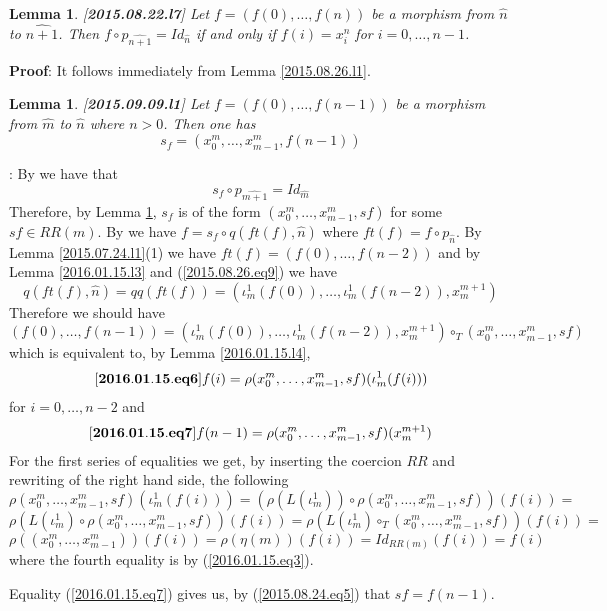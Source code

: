 \documentclass[11pt]{article}
\newenvironment{eq}{\begin{equation}}{\end{equation}}
\newenvironment{proof}{{\bf Proof}:}{\vskip 5mm }
\newtheorem{lemma}[proposition]{Lemma}
\newcommand{\llabel}[1]{\label{#1}[{\bf #1}]}
\newcommand{\wh}{\widehat}
\newcommand{\mbind}{\rho}
\newcommand{\hc}{\circ_{T}}
\begin{document}
%
\begin{lemma}
\llabel{2015.08.22.l7}
Let $f=(f(0),\dots,f(n))$ be a morphism from $\wh{n}$ to $\wh{n+1}$. Then $f\circ p_{\wh{n+1}}=Id_{\wh{n}}$ if and only if $f(i)=x_i^{n}$ for $i=0,\dots,n-1$.
\end{lemma}
%
\begin{proof}
It follows immediately from Lemma \ref{2015.08.26.l1}.
\end{proof}
%
\begin{lemma}
\llabel{2015.09.09.l1}
Let $f=(f(0),\dots,f(n-1))$ be a morphism from $\wh{m}$ to $\wh{n}$ where $n>0$. Then one has
%
$$s_f=(x_0^{m},\dots,x_{m-1}^{m},f(n-1))$$
%
\end{lemma}
%
\begin{proof}
By \cite[Definition 2.3(2)]{Csubsystems} we have that 
%
$$s_f\circ p_{\wh{m+1}}=Id_{\wh{m}}$$
%
Therefore, by Lemma \ref{2015.08.22.l7}, $s_f$ is of the form $(x_0^m,\dots,x_{m-1}^m,sf)$ for some $sf\in RR(m)$. By \cite[Definition 2.3(3)]{Csubsystems} we have $f=s_f\circ q(ft(f),\wh{n})$ where $ft(f)=f\circ p_{\wh{n}}$. By Lemma \ref{2015.07.24.l1}(1) we have $ft(f)=(f(0),\dots,f(n-2))$ and by  Lemma \ref{2016.01.15.l3} and (\ref{2015.08.26.eq9}) we have
%
$$q(ft(f),\wh{n})=qq(ft(f))=(\iota_m^1(f(0)),\dots,\iota_m^1(f(n-2)),x_{m}^{m+1})$$
%
Therefore we should have
%
$$(f(0),\dots,f(n-1))=(\iota_m^1(f(0)),\dots,\iota_m^1(f(n-2)),x_{m}^{m+1})\hc (x_0^m,\dots,x_{m-1}^m,sf)$$
%
which is equivalent to, by Lemma \ref{2016.01.15.l4}, 
%
\begin{eq}\llabel{2016.01.15.eq6}
f(i)=\mbind(x_0^m,\dots,x_{m-1}^m,sf)(\iota_m^1(f(i)))
\end{eq}
%
for $i=0,\dots,n-2$ and 
%
\begin{eq}\llabel{2016.01.15.eq7}
f(n-1)=\mbind(x_0^m,\dots,x_{m-1}^m,sf)(x_{m}^{m+1})
\end{eq}
%
For the first series of equalities we get, by inserting the coercion $RR$ and rewriting of the right hand side, the following
%
$$\mbind(x_0^m,\dots,x_{m-1}^m,sf)(\iota_m^1(f(i)))=(\mbind(L(\iota_m^1))\circ \mbind(x_0^m,\dots,x_{m-1}^m,sf))(f(i))=$$$$\mbind(L(\iota_m^1)\circ \mbind(x_0^m,\dots,x_{m-1}^m,sf))(f(i))=\mbind(L(\iota_m^1)\hc (x_0^m,\dots,x_{m-1}^m,sf))(f(i))=$$$$\mbind((x_0^m,\dots,x_{m-1}^m))(f(i))=\mbind(\eta(m))(f(i))=Id_{RR(m)}(f(i))=f(i)$$
%
where the fourth equality is by (\ref{2016.01.15.eq3}). 

Equality (\ref{2016.01.15.eq7}) gives us, by (\ref{2015.08.24.eq5}) that $sf=f(n-1)$.
\end{proof}
%
%
\end{document}

